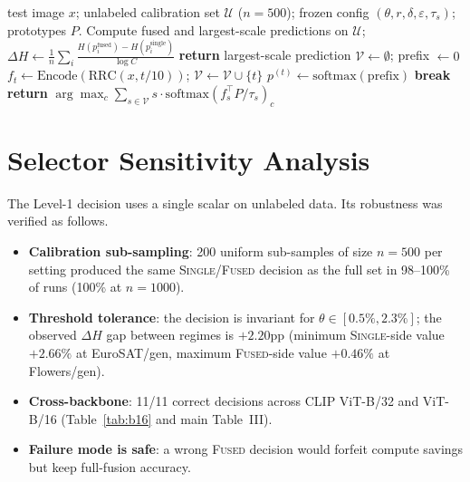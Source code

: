 \documentclass[10pt]{article}
\begin{document}
\begin{algorithm}[t]
\caption{AdaScale: hierarchical training-free controller}
\begin{algorithmic}[1]
\Require test image $x$; unlabeled calibration set $\mathcal{U}$ ($n{=}500$);
frozen config $(\theta, r, \delta, \varepsilon, \tau_s)$; prototypes $P$.
\State Compute fused and largest-scale predictions on $\mathcal{U}$;
$\Delta H \gets \frac{1}{n}\sum_i \frac{H(p^{\text{fused}}_i)-H(p^{\text{single}}_i)}{\log C}$
 
    \State \textbf{return} largest-scale prediction 
\Else {}
    \State $\mathcal{V} \gets \emptyset$; prefix $\gets 0$
        \State $f_t \gets \mathrm{Encode}(\mathrm{RRC}(x, t/10))$;
        $\mathcal{V} \gets \mathcal{V} \cup \{t\}$
        \State $p^{(t)} \gets \mathrm{softmax}(\mathrm{prefix})$ 
            \State \textbf{break} 
        \EndIf
    \EndFor
    \State \textbf{return} $\arg\max_c \sum_{s \in \mathcal{V}} s \cdot
    \mathrm{softmax}\!\left(f_s^\top P / \tau_s\right)_c$
\EndIf
\end{algorithmic}
\end{algorithm}

\section{Selector Sensitivity Analysis}
\label{s:select}

The Level-1 decision uses a single scalar on unlabeled data. Its
robustness was verified as follows.
\begin{itemize}
\item \textbf{Calibration sub-sampling}: 200 uniform sub-samples of size
$n{=}500$ per setting produced the same \textsc{Single}/\textsc{Fused}
decision as the full set in 98--100\% of runs (100\% at $n{=}1000$).
\item \textbf{Threshold tolerance}: the decision is invariant for
$\theta \in [0.5\%, 2.3\%]$; the observed $\Delta H$ gap between regimes is
$+2.20$pp (minimum \textsc{Single}-side value $+2.66\%$ at EuroSAT/gen,
maximum \textsc{Fused}-side value $+0.46\%$ at Flowers/gen).
\item \textbf{Cross-backbone}: 11/11 correct decisions across CLIP
ViT-B/32 and ViT-B/16 (Table~\ref{tab:b16} and main Table~III).
\item \textbf{Failure mode is safe}: a wrong \textsc{Fused} decision would
forfeit compute savings but keep full-fusion accuracy.
\end{itemize}
\end{document}

